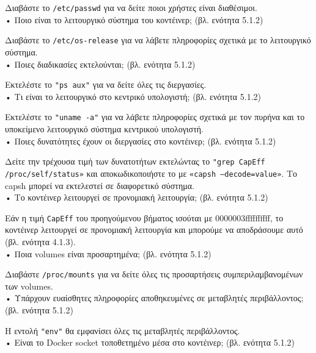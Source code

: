 Διαβάστε το \texttt{\textlatin{/etc/passwd}} για να δείτε ποιοι χρήστες είναι
διαθέσιμοι. \\

• Ποιο είναι το λειτουργικό σύστημα του κοντέινερ; (βλ. ενότητα 5.1.2)

Διαβάστε το \texttt{\textlatin{/etc/os-release}} για να λάβετε πληροφορίες
σχετικά με το λειτουργικό σύστημα. \\

• Ποιες διαδικασίες εκτελούνται; (βλ. ενότητα 5.1.2)

Εκτελέστε το \texttt{\textlatin{"ps aux"}} για να δείτε όλες τις διεργασίες. \\

• Τι είναι το λειτουργικό στο κεντρικό υπολογιστή; (βλ. ενότητα 5.1.2)

Εκτελέστε το \texttt{\textlatin{"uname -a"}} για να λάβετε πληροφορίες σχετικά
με τον πυρήνα και το υποκείμενο λειτουργικό σύστημα κεντρικού υπολογιστή. \\

• Ποιες δυνατότητες έχουν οι διεργασίες στο κοντέινερ; (βλ. ενότητα 5.1.2)

Δείτε την τρέχουσα τιμή των δυνατοτήτων εκτελώντας το
\texttt{\textlatin{"grep CapEff /proc/self/status»}} και αποκωδικοποιήστε το με
\texttt{\textlatin{«capsh --decode=value»}}. Το \textlatin{capsh}
μπορεί να εκτελεστεί σε διαφορετικό σύστημα. \\

• Το κοντέινερ λειτουργεί σε προνομιακή λειτουργία; (βλ. ενότητα 5.1.2)

Εάν η τιμή \texttt{\textlatin{CapEff}} του προηγούμενου βήματος ισούται με
0000003ffffffffff, το κοντέινερ λειτουργεί σε προνομιακή λειτουργία και μπορούμε
να αποδράσουμε αυτό (βλ. ενότητα 4.1.3). \\

• Ποια \textlatin{volumes} είναι προσαρτημένα; (βλ. ενότητα 5.1.2)

Διαβάστε \texttt{\textlatin{/proc/mounts}} για να δείτε όλες τις προσαρτήσεις
συμπεριλαμβανομένων των \textlatin{volumes}. \\

• Υπάρχουν ευαίσθητες πληροφορίες αποθηκευμένες σε μεταβλητές περιβάλλοντος;
(βλ. ενότητα 5.1.2)

Η εντολή \texttt{\textlatin{"env"}} θα εμφανίσει όλες τις μεταβλητές
περιβάλλοντος. \\


• Είναι το \textlatin{Docker socket} τοποθετημένο μέσα στο κοντέινερ;
(βλ. ενότητα 5.1.2)

